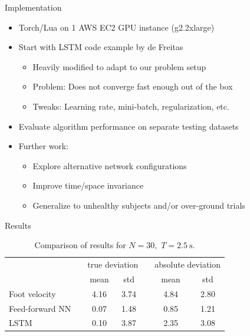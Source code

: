 \documentclass{beamer}
\newcommand{\ra}[1]{\renewcommand{\arraystretch}{#1}}
\begin{document}
\begin{frame}{Implementation}
    \begin{itemize}
        \item Torch/Lua on 1 AWS EC2 GPU instance (g2.2xlarge)
        \item Start with LSTM code example by de Freitas
        \begin{itemize}
            \item Heavily modified to adapt to our problem setup
            \item Problem: Does not converge fast enough out of the box
            \item Tweaks: Learning rate, mini-batch, regularization, etc.
        \end{itemize}
        \item Evaluate algorithm performance on separate testing datasets
        \item Further work:
        \begin{itemize}
            \item Explore alternative network configurations
            \item Improve time/space invariance
            \item Generalize to unhealthy subjects and/or over-ground trials
        \end{itemize}
    \end{itemize}
\end{frame}

\begin{frame}{Results}
    \begin{table}[H]
        \begin{center}
        \ra{1.2}
        \begin{tabular}{@{} l c cc c cc @{}}
        \toprule
        && 
        \multicolumn{2}{c}{true deviation} 
        && 
        \multicolumn{2}{c}{absolute deviation} 
        \\
        \cmidrule{3-4} \cmidrule{6-7}
        {} && mean & std && mean & std \\
        \midrule
        Foot velocity   &&   4.16  &  3.74  &&  4.84  &  2.80 \\
        Feed-forward NN &&   0.07  &  1.48  &&  0.85  &  1.21 \\
        LSTM            &&   0.10  &  3.87  &&  2.35  &  3.08 \\
        \bottomrule
        \end{tabular}
        \caption
        {
            Comparison of results for
            \(
                N
                =
                30
                ,
            \)
            \(
                T
                =
                \SI
                {
                    2.5
                }
                {
                    \second
                }
                .
            \)
        }
        \end{center}
    \end{table}
\end{frame}
\end{document}
